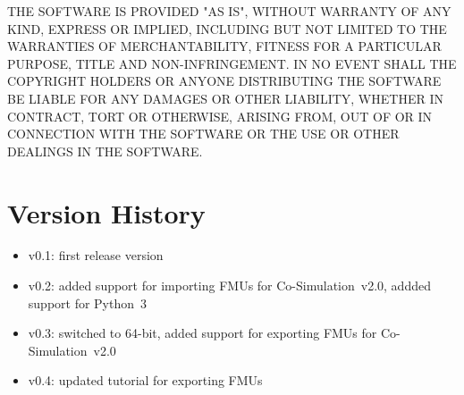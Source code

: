THE SOFTWARE IS PROVIDED "AS IS", WITHOUT WARRANTY OF ANY KIND, EXPRESS OR
IMPLIED, INCLUDING BUT NOT LIMITED TO THE WARRANTIES OF MERCHANTABILITY,
FITNESS FOR A PARTICULAR PURPOSE, TITLE AND NON-INFRINGEMENT. IN NO EVENT
SHALL THE COPYRIGHT HOLDERS OR ANYONE DISTRIBUTING THE SOFTWARE BE LIABLE
FOR ANY DAMAGES OR OTHER LIABILITY, WHETHER IN CONTRACT, TORT OR OTHERWISE,
ARISING FROM, OUT OF OR IN CONNECTION WITH THE SOFTWARE OR THE USE OR OTHER
DEALINGS IN THE SOFTWARE.

\section{Version History}

\begin{itemize}
  \item v0.1: first release version
  \item v0.2: added support for importing FMUs for Co-Simulation~v2.0, addded support for Python~3
  \item v0.3: switched to 64-bit, added support for exporting FMUs for Co-Simulation~v2.0
  \item v0.4: updated tutorial for exporting FMUs
\end{itemize}
